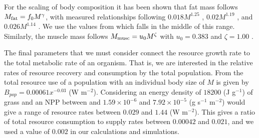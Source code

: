\documentclass{pnastwo}
\begin{document}
\begin{article}
For the scaling of body composition it has been shown that fat mass follows $M_{\rm fat}=f_{0}M^{\gamma}$, with measured  relationships following  $0.018M^{1.25}$ \cite{Dunbrack:1993ec}, $0.02M^{1.19}$ \cite{Lindstedt:1985hm}, and $0.026M^{1.14}$ \cite{Lindstedt:2002td}. We use the values from \cite{Lindstedt:1985hm} which falls in the middle of this range. Similarly, the muscle mass follows $M_{\rm musc}=u_{0}M^{\zeta}$ with $u_{0}=0.383$ and $\zeta=1.00$ \cite{Lindstedt:2002td}.

The final parameters that we must consider connect the resource growth rate to the total metabolic rate of an organism. That is, we are interested in the relative rates of resource recovery and consumption by the total population. From \cite{allen2002global} the total resource use of a population with an individual body size of $M$ is given by $B_{pop}=0.00061x^{-0.03}$ (W m$^{-2}$). Considering an energy density of $18200$ (J g$^{-1}$) of grass \cite{estermann} and an NPP between and $1.59\times10^{-6}$ and $7.92\times10^{-5}$ (g s$^{-1}$ m$^{-2}$) would give a range of resource rates between  $0.029$ and $1.44$ (W m$^{-2}$). This gives a ratio of total resource consumption to supply rates between $0.00042$ and $0.021$, and we used a value of $0.002$ in our calculations and simulations.





\end{article}
\end{document}

